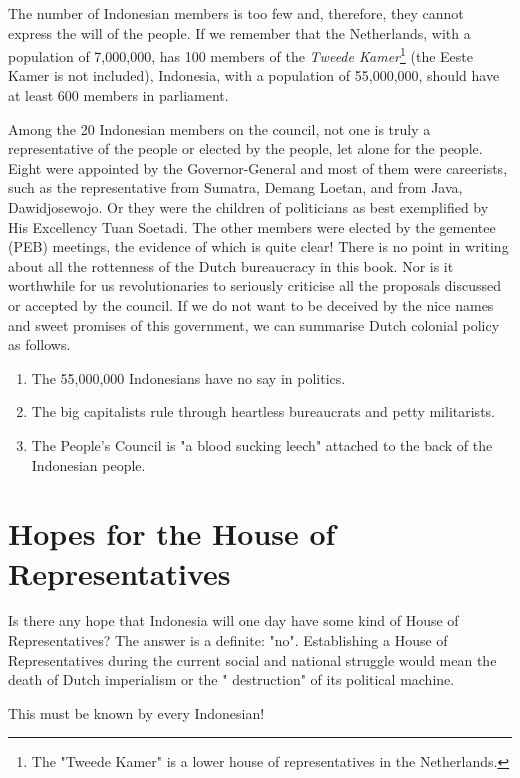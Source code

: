 The number of Indonesian members is too few and, therefore, they cannot express the will of the people. 
If we remember that the Netherlands, with a population of 7,000,000, has 100 members of the \emph{Tweede Kamer}\footnote[9]{The "Tweede Kamer" is a lower house of representatives in the Netherlands.} 
(the Eeste Kamer is not included), Indonesia, with a population of 55,000,000, should have at least 600 members in parliament.\nline

Among the 20 Indonesian members on the council, not one is truly a representative of the people or elected by the people, 
let alone for the people. Eight were appointed by the Governor-General and most of them were careerists, such as the 
representative from Sumatra, Demang Loetan, and from Java, Dawidjosewojo. Or they were the children of politicians as 
best exemplified by His Excellency Tuan Soetadi. The other members were elected by the gementee (PEB) meetings, the 
evidence of which is quite clear! There is no point in writing about all the rottenness of the Dutch bureaucracy in 
this book. Nor is it worthwhile for us revolutionaries to seriously criticise all the proposals discussed or accepted 
by the council. If we do not want to be deceived by the nice names and sweet promises of this government, we can 
summarise Dutch colonial policy as follows.\nline

\begin{enumerate}
    \item The 55,000,000 Indonesians have no say in politics.
    \item The big capitalists rule through heartless bureaucrats and petty militarists.
    \item The People's Council is "a blood sucking leech" attached to the back of the Indonesian people.
\end{enumerate}

\section{Hopes for the House of Representatives}

Is there any hope that Indonesia will one day have some kind of House of Representatives? 
The answer is a definite: "no". Establishing a House of Representatives during the current 
social and national struggle would mean the death of Dutch imperialism or the " destruction" of its political machine.\nline

This must be known by every Indonesian!\nline


